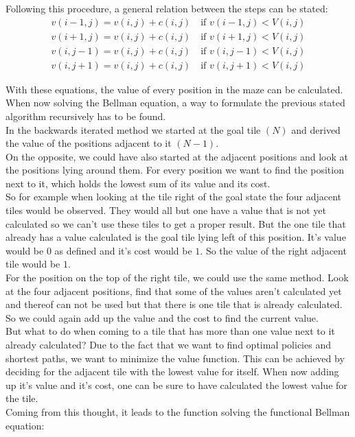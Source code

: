 \documentclass[conference]{IEEEtran}
\begin{document}
Following this procedure, a general relation between the steps can be stated:
\begin{align}
v(i-1,j) = v(i,j) + c(i,j) \quad \text{if } v(i-1,j) < V(i,j)\\
v(i+1,j) = v(i,j) + c(i,j) \quad \text{if } v(i+1,j) < V(i,j)\\
v(i,j-1) = v(i,j) + c(i,j) \quad \text{if } v(i,j-1) < V(i,j)\\
v(i,j+1) = v(i,j) + c(i,j) \quad \text{if } v(i,j+1) < V(i,j)
\end{align}

With these equations, the value of every position in the maze can be calculated.\\
When now solving the Bellman equation, a way to formulate the previous stated algorithm recursively has to be found.\\
In the backwards iterated method we started at the goal tile $(N)$ and derived the value of the positions adjacent to it $(N-1)$. \\
On the opposite, we could have also started at the adjacent positions and look at the positions lying around them. For every position we want to find the position next to it, which holds the lowest sum of its value and its cost.\\
So for example when looking at the tile right of the goal state the four adjacent tiles would be observed. They would all but one have a value that is not yet calculated so we can't use these tiles to get a proper result. But the one tile that already has a value calculated is the goal tile lying left of this position. It's value would be $0$ as defined and it's cost would be $1$. So the value of the right adjacent tile would be $1$.\\
For the position on the top of the right tile, we could use the same method. Look at the four adjacent positions, find that some of the values aren't calculated yet and thereof can not be used but that there is one tile that is already calculated. So we could again add up the value and the cost to find the current value.\\
But what to do when coming to a tile that has more than one value next to it already calculated? Due to the fact that we want to find optimal policies and shortest paths, we want to minimize the value function. This can be achieved by deciding for the adjacent tile with the lowest value for itself. When now adding up it's value and it's cost, one can be sure to have calculated the lowest value for the tile.\\
Coming from this thought, it leads to the function solving the functional Bellman equation:
\end{document}
